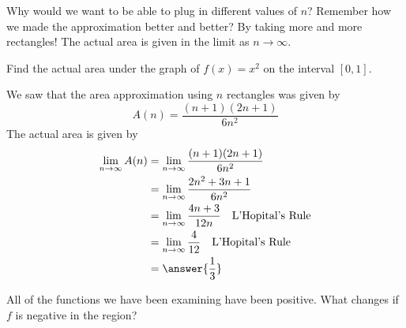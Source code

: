 \documentclass{ximera}
\begin{document}
Why would we want to be able to plug in different values of $n$?  Remember how we made the approximation better and better?  By taking
more and more rectangles!  The actual area is given in the limit as $n\to \infty$.

\begin{example}
	Find the actual area under the graph of $f(x)=x^2$ on the interval $[0,1]$.
	\begin{explanation}
		We saw that the area approximation using $n$ rectangles was given by
		\[ A(n) = \frac{(n+1)(2n+1)}{6n^2} \]
		The actual area is given by
		\begin{align*}
			\lim_{n\to\infty} A(n) &= \lim_{n\to\infty} \frac{(n+1)(2n+1)}{6n^2}\\
				&= \lim_{n\to\infty} \frac{2n^2+3n+1}{6n^2} \\
				&= \lim_{n\to\infty} \frac{4n+3}{12n} \quad \text{L'Hopital's Rule}\\
				&= \lim_{n\to\infty} \frac{4}{12} \quad \text{L'Hopital's Rule}\\
				&= \answer{\frac{1}{3}}
		\end{align*}
	\end{explanation}
\end{example}

All of the functions we have been examining have been positive.  What changes if $f$ is negative in the region?
\end{document}
